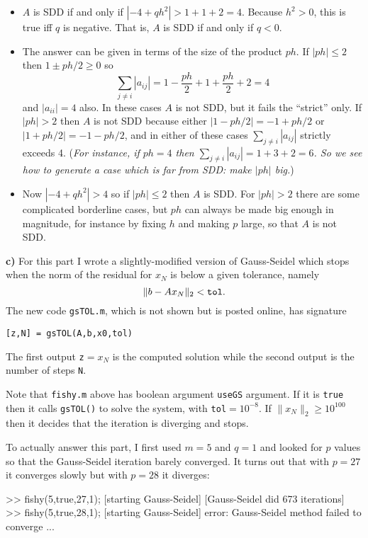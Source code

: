 \documentclass[11pt]{amsart}
\newcommand{\epart}[1]{\medskip\noindent\textbf{#1)}}
\begin{document}
\begin{itemize}
\item[\fbox{$p=0$}]  $A$ is SDD if and only if $|-4+q h^2| > 1 + 1 + 2 = 4$.  Because $h^2>0$, this is true iff $q$ is negative.  That is, $A$ is SDD if and only if $q < 0$.

\item[\fbox{$q=0$}]  The answer can be given in terms of the size of the product $ph$.  If $|ph| \le 2$ then $1\pm ph/2 \ge 0$ so
    $$\sum_{j\ne i} |a_{ij}| = 1 - \frac{ph}{2} + 1 + \frac{ph}{2} + 2 = 4$$
and $|a_{ii}|=4$ also.  In these cases $A$ is not SDD, but it fails the ``strict'' only.  If $|ph| > 2$ then $A$ is not SDD because either $|1-ph/2| = -1 + ph/2$ or $|1+ph/2|=-1-ph/2$, and in either of these cases $\sum_{j\ne i} |a_{ij}|$ strictly exceeds 4.  (\emph{For instance, if $ph=4$ then $\sum_{j\ne i} |a_{ij}| = 1 + 3 + 2 = 6$.  So we see how to generate a case which is far from SDD: make $|ph|$ big.})

\item[\fbox{$q = -1$}]  Now $|-4+qh^2|>4$ so if $|ph| \le 2$ then $A$ is SDD.  For $|ph|>2$ there are some complicated borderline cases, but $ph$ can always be made big enough in magnitude, for instance by fixing $h$ and making $p$ large, so that $A$ is not SDD.
\end{itemize}

\epart{c}  For this part I wrote a slightly-modified version of Gauss-Seidel which stops when the norm of the residual for $x_N$ is below a given tolerance, namely
    $$\|b - A x_N\|_2 < \text{\texttt{tol}}.$$
The new code \texttt{gsTOL.m}, which is not shown but is posted online, has signature
\begin{center}
\verb|[z,N] = gsTOL(A,b,x0,tol)|
\end{center}
The first output \texttt{z}$=x_N$ is the computed solution while the second output is the number of steps \texttt{N}.

Note that \texttt{fishy.m} above has boolean argument \texttt{useGS} argument.  If it is \texttt{true} then it calls \texttt{gsTOL()} to solve the system, with \texttt{tol}$=10^{-8}$.  If $\|x_N\|_2 \ge 10^{100}$ then it decides that the iteration is diverging and stops.

To actually answer this part, I first used $m=5$ and $q=1$ and looked for $p$ values so that the Gauss-Seidel iteration barely converged.  It turns out that with $p=27$ it converges slowly but with $p=28$ it diverges:
\begin{mVerb}
>> fishy(5,true,27,1);
[starting Gauss-Seidel]
[Gauss-Seidel did 673 iterations]
>> fishy(5,true,28,1);
[starting Gauss-Seidel]
error: Gauss-Seidel method failed to converge
...
\end{mVerb}
\end{document}
